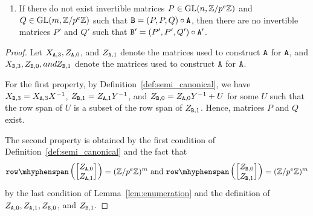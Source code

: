 \begin{lemma}
\begin{enumerate}

\item If there do not exist invertible matrices $P \in \mathrm{GL}(n, \mathbb{Z} / p^e \mathbb{Z})$ and $Q \in \mathrm{GL}(m, \mathbb{Z} / p^e \mathbb{Z})$ such that $\mathtt{B} = (P, P, Q) \circ \mathtt{A}$, 
then 
there are no invertible matrices $P'$ and $Q'$ such that $\mathtt{B}' = (P', P', Q') \circ \mathtt{A}'$.
\end{enumerate}

\end{lemma}
\begin{proof}
Let $X_{\mathtt{A}, 3}, Z_{\mathtt{A}, 0}$, and $Z_{\mathtt{A}, 1}$ denote the matrices used to construct $\mathtt{A}$ for $\mathtt{A}$, and $X_{\mathtt{B}, 3}, Z_{\mathtt{B}, 0}, and Z_{\mathtt{B}, 1}$ denote the matrices used to construct $\mathtt{A}$ for $\mathtt{A}$. 

For the first property, by Definition~\ref{def:semi_canonical}, 
we have $X_{\mathtt{B}, 3} = X_{\mathtt{A}, 3} X^{-1}$, $Z_{\mathtt{B}, 1} = Z_{\mathtt{A}, 1} Y^{-1}$, and 
$Z_{\mathtt{B}, 0} = Z_{\mathtt{A}, 0} Y^{-1} + U$ for some $U$ such that the row span of $U$ is a subset of the row span of $Z_{\mathtt{B}, 1}$. 
Hence, matrices $P$ and $Q$ exist. 

The second property is obtained by the first condition of Definition~\ref{def:semi_canonical} and the fact that 
\[\rowspan\left(\begin{bmatrix} Z_{\tA, 0} \\ Z_{\tA, 1} \end{bmatrix}\right)  = (\Z / p^e \Z)^m \text{ and } \rowspan\left(\begin{bmatrix} Z_{\tB, 0} \\ Z_{\tB, 1} \end{bmatrix}\right)  = (\Z / p^e \Z)^m \] 
by the last condition of Lemma~\ref{lem:enumeration} and the definition of $Z_{\mathtt{A}, 0}, Z_{\mathtt{A}, 1}, Z_{\mathtt{B}, 0}$, and $Z_{\mathtt{B}, 1}$.  
\end{proof}

